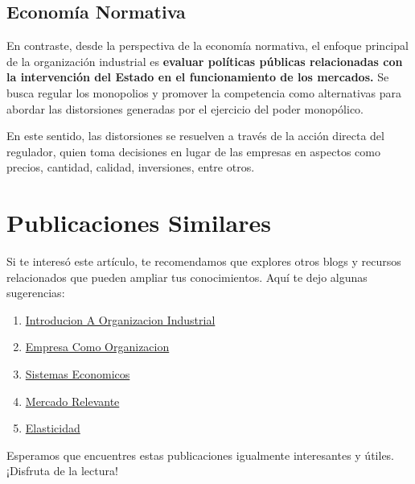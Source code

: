 \documentclass[
  doc,
  floatsintext,
  longtable,
  a4paper,
  nolmodern,
  notxfonts,
  notimes,
  12pt,
  colorlinks=true,linkcolor=blue,citecolor=blue,urlcolor=blue]{apa7}
\providecommand{\tightlist}{%
  \setlength{\itemsep}{0pt}\setlength{\parskip}{0pt}}
\begin{document}
\subsection{Economía Normativa}\label{economuxeda-normativa}

En contraste, desde la perspectiva de la economía normativa, el enfoque
principal de la organización industrial es \textbf{evaluar políticas
públicas relacionadas con la intervención del Estado en el
funcionamiento de los mercados.} Se busca regular los monopolios y
promover la competencia como alternativas para abordar las distorsiones
generadas por el ejercicio del poder monopólico.

En este sentido, las distorsiones se resuelven a través de la acción
directa del regulador, quien toma decisiones en lugar de las empresas en
aspectos como precios, cantidad, calidad, inversiones, entre otros.

\section{Publicaciones Similares}\label{publicaciones-similares}

Si te interesó este artículo, te recomendamos que explores otros blogs y
recursos relacionados que pueden ampliar tus conocimientos. Aquí te dejo
algunas sugerencias:

\begin{enumerate}
\def\labelenumi{\arabic{enumi}.}
\tightlist
\item
  \href{https://optimums.netlify.app/organizacion-industrial/2023-06-12-introducion-a-organizacion-industrial/index.pdf}{}
  \href{https://optimums.netlify.app/organizacion-industrial/2023-06-12-introducion-a-organizacion-industrial}{Introducion
  A Organizacion Industrial}
\item
  \href{https://optimums.netlify.app/organizacion-industrial/2023-06-13-empresa-como-organizacion/index.pdf}{}
  \href{https://optimums.netlify.app/organizacion-industrial/2023-06-13-empresa-como-organizacion}{Empresa
  Como Organizacion}
\item
  \href{https://optimums.netlify.app/organizacion-industrial/2023-06-13-sistemas-economicos/index.pdf}{}
  \href{https://optimums.netlify.app/organizacion-industrial/2023-06-13-sistemas-economicos}{Sistemas
  Economicos}
\item
  \href{https://optimums.netlify.app/organizacion-industrial/2023-06-15-mercado-relevante/index.pdf}{}
  \href{https://optimums.netlify.app/organizacion-industrial/2023-06-15-mercado-relevante}{Mercado
  Relevante}
\item
  \href{https://optimums.netlify.app/organizacion-industrial/2023-06-23-elasticidad/index.pdf}{}
  \href{https://optimums.netlify.app/organizacion-industrial/2023-06-23-elasticidad}{Elasticidad}
\end{enumerate}

Esperamos que encuentres estas publicaciones igualmente interesantes y
útiles. ¡Disfruta de la lectura!
\end{document}
